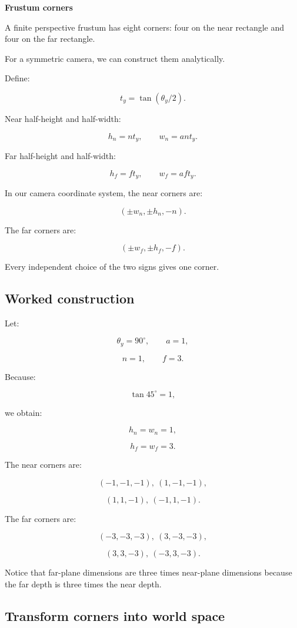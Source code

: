 \textbf{Frustum corners}

A finite perspective frustum has eight corners: four on the near rectangle and four on the far rectangle.

For a symmetric camera, we can construct them analytically.

Define:

\[
 t_y=\tan(\theta_y/2).
\]

Near half-height and half-width:

\[
 \boxed{ h_n=nt_y,\qquad w_n=ant_y }.
\]

Far half-height and half-width:

\[
 \boxed{ h_f=ft_y,\qquad w_f=aft_y }.
\]

In our camera coordinate system, the near corners are:

\[
 \boxed{ (\pm w_n,\pm h_n,-n) }.
\]

The far corners are:

\[
 \boxed{ (\pm w_f,\pm h_f,-f) }.
\]

Every independent choice of the two signs gives one corner.

\subsection{Worked construction}\label{02-foundations-ii-ch034-worked-construction}

Let:

\[
 \theta_y=90^\circ,\qquad a=1,
\]

\[
 n=1,\qquad f=3.
\]

Because:

\[
 \tan45^\circ=1,
\]

we obtain:

\[
 h_n=w_n=1,
\]

\[
 h_f=w_f=3.
\]

The near corners are:

\[
 (-1,-1,-1),\ (1,-1,-1),
\]

\[
 (1,1,-1),\ (-1,1,-1).
\]

The far corners are:

\[
 (-3,-3,-3),\ (3,-3,-3),
\]

\[
 (3,3,-3),\ (-3,3,-3).
\]

Notice that far-plane dimensions are three times near-plane dimensions because the far depth is three times the near depth.

\subsection{Transform corners into world space}\label{02-foundations-ii-ch034-transform-corners-into-world-space}

